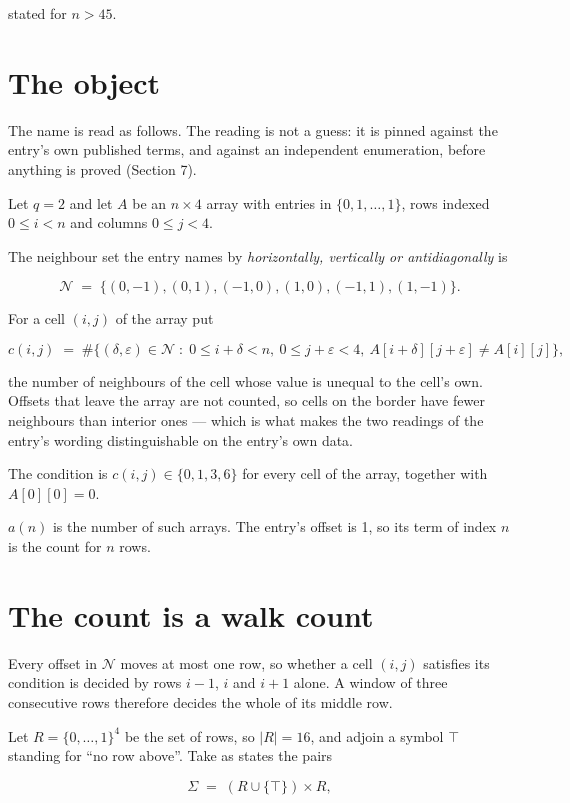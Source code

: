 \documentclass[11pt]{article}
\theoremstyle{definition}
\begin{document}
stated for $n > 45$.

\section{The object}

The name is read as follows. The reading is not a guess: it is pinned against the entry's own published terms, and against an independent enumeration, before anything is proved (Section 7).

Let $q = 2$ and let $A$ be an $n \times 4$ array with entries in $\{0,1,\dots,1\}$, rows indexed $0 \le i < n$ and columns $0 \le j < 4$.

The neighbour set the entry names by {\itshape horizontally, vertically or antidiagonally} is

\[\mathcal{N} \;=\; \{(0,-1), (0,1), (-1,0), (1,0), (-1,1), (1,-1)\}.\]

For a cell $(i,j)$ of the array put

\[c(i,j) \;=\; \#\bigl\{(\delta,\varepsilon)\in\mathcal{N} \;:\; 0\le i+\delta<n,\ 0\le j+\varepsilon<4,\ A[i+\delta][j+\varepsilon] \neq A[i][j]\bigr\},\]

the number of neighbours of the cell whose value is unequal to the cell's own. Offsets that leave the array are not counted, so cells on the border have fewer neighbours than interior ones --- which is what makes the two readings of the entry's wording distinguishable on the entry's own data.

The condition is $c(i,j) \in \{0, 1, 3, 6\}$ for every cell of the array, together with $A[0][0]=0$.

$a(n)$ is the number of such arrays. The entry's offset is 1, so its term of index $n$ is the count for $n$ rows.

\section{The count is a walk count}

Every offset in $\mathcal{N}$ moves at most one row, so whether a cell $(i,j)$ satisfies its condition is decided by rows $i-1$, $i$ and $i+1$ alone. A window of three consecutive rows therefore decides the whole of its middle row.

Let $R = \{0,\dots,1\}^{4}$ be the set of rows, so $|R| = 16$, and adjoin a symbol $\top$ standing for ``no row above''. Take as states the pairs

\[\Sigma \;=\; (R \cup \{\top\}) \times R,\]
\end{document}
